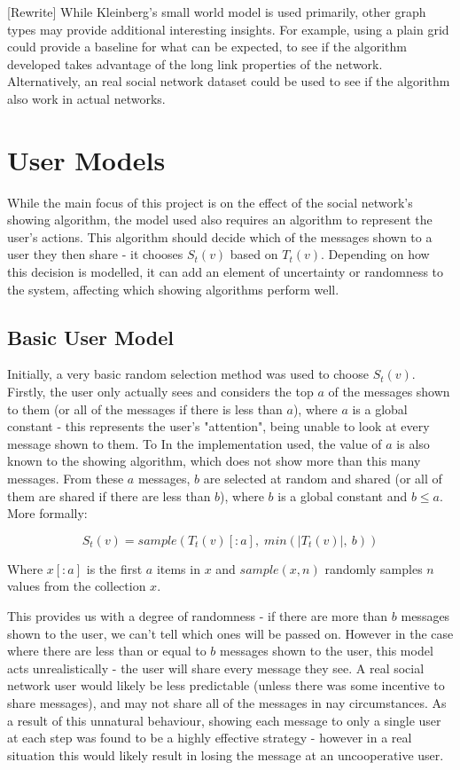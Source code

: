 \documentclass[bsc,frontabs,twoside,singlespacing,parskip,deptreport]{infthesis}     %
\begin{document}
[Rewrite] While Kleinberg's small world model is used primarily, other graph types may provide additional interesting insights. For example, using a plain grid could provide a baseline for what can be expected, to see if the algorithm developed takes advantage of the long link properties of the network. Alternatively, an real social network dataset could be used to see if the algorithm also work in actual networks.

\section{User Models} \label{sec:user_models}
While the main focus of this project is on the effect of the social network's showing algorithm, the model used also requires an algorithm to represent the user's actions. This algorithm should decide which of the messages shown to a user they then share - it chooses $S_{t}(v)$ based on $T_{t}(v)$. Depending on how this decision is modelled, it can add an element of uncertainty or randomness to the system, affecting which showing algorithms perform well.

\subsection{Basic User Model}
Initially, a very basic random selection method was used to choose $S_{t}(v)$. Firstly, the user only actually sees and considers the top $a$ of the messages shown to them (or all of the messages if there is less than $a$), where $a$ is a global constant - this represents the user's "attention", being unable to look at every message shown to them. To In the implementation used, the value of $a$ is also known to the showing algorithm, which does not show more than this many messages. From these $a$ messages, $b$ are selected at random and shared (or all of them are shared if there are less than $b$), where $b$ is a global constant and $b \le a$. More formally:

\begin{equation}
S_{t}(v) = sample(T_{t}(v)[:a], \; min(|T_{t}(v)|,\: b))
\end{equation}

Where $x[:a]$ is the first $a$ items in $x$ and $sample(x, n)$ randomly samples $n$ values from the collection $x$.

This provides us with a degree of randomness - if there are more than $b$ messages shown to the user, we can't tell which ones will be passed on. However in the case where there are less than or equal to $b$ messages shown to the user, this model acts unrealistically - the user will share every message they see. A real social network user would likely be less predictable (unless there was some incentive to share messages), and may not share all of the messages in nay circumstances. As a result of this unnatural behaviour, showing each message to only a single user at each step was found to be a highly effective strategy - however in a real situation this would likely result in losing the message at an uncooperative user.
\end{document}
